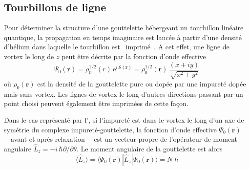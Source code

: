 		\subsection*{Tourbillons de ligne}
			Pour déterminer la structure d'une gouttelette hébergeant un tourbillon linéaire quantique, la propagation en temps imaginaire est lancée à partir d'une densité d'hélium dans laquelle le tourbillon est \guillemotleft~imprimé~\guillemotright. 
			A cet effet, une ligne de vortex le long de $z$ peut être décrite par la fonction d'onde effective 
			\begin{equation}
				\Psi_0(\mathbf{r}) = \rho_0^{1/2}(r)\,\mathrm{e}^{i\,{\mathcal S}(\mathbf{r})} = \rho_0^{1/2}(\mathbf{r}) \, \frac{(x + i y)}{\sqrt{x^2 + y^2}} \label{eq11-sum}
			\end{equation}
			où $\rho_0(\mathbf{r})$ est la densité de la gouttelette pure ou dopée par une impureté dopée mais sans vortex. 
			Les lignes de vortex le long d'autres directions passant par un point choisi peuvent également être imprimées de cette façon\citep{Pi07}.

			Dans le cas représenté par l', si l'impureté est dans le vortex le long d'un axe de symétrie du complexe impureté-gouttelette, la fonction d'onde effective $\Psi_0({\mathbf r})$ ---avant et après relaxation--- est un vecteur propre de l'opérateur de moment angulaire $\hat{L}_z=-i\,\hbar\partial/\partial\theta$.
			Le moment angulaire de la gouttelette est alors
			\begin{equation}
				\langle \hat{L}_z \rangle = \langle \Psi_0(\mathbf{r}) | \hat{L}_z | \Psi_0(\mathbf{r}) \rangle = N \; \hbar
				\label{eq12-sum}
			\end{equation}


